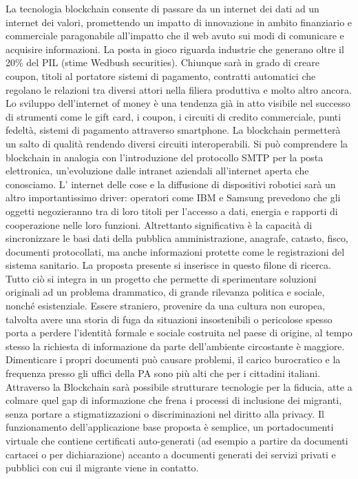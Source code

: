 La tecnologia blockchain consente di passare da un internet dei dati ad un internet dei valori, promettendo un impatto di innovazione in ambito finanziario e commerciale paragonabile all’impatto che il web avuto sui modi di comunicare e acquisire informazioni.
La posta in gioco riguarda industrie che generano oltre il 20\% del PIL (stime Wedbush securities). Chiunque sarà in grado di creare coupon, titoli al portatore sistemi di pagamento, contratti automatici che regolano le relazioni tra diversi attori nella filiera produttiva e molto altro ancora.
Lo sviluppo dell’internet of money è una tendenza già in atto visibile nel successo di strumenti come le gift card, i coupon, i circuiti di credito commerciale, punti fedeltà, sistemi di pagamento attraverso smartphone.
La blockchain permetterà un salto di qualità rendendo diversi circuiti interoperabili. Si può comprendere la blockchain in analogia con l’introduzione del protocollo SMTP per la posta elettronica, un’evoluzione dalle intranet aziendali all’internet aperta che conosciamo.
L’ internet delle cose e la diffusione di dispositivi robotici sarà un altro importantissimo driver: operatori come IBM e Samsung prevedono che gli oggetti negozieranno tra di loro titoli per l’accesso a dati, energia e rapporti di cooperazione nelle loro funzioni.
Altrettanto significativa è la capacità di sincronizzare le basi dati della pubblica amministrazione, anagrafe, catasto, fisco, documenti protocollati, ma anche informazioni protette come le registrazioni del sistema sanitario. La proposta presente si inserisce in questo filone di ricerca.
Tutto ciò si integra in un progetto che permette di sperimentare soluzioni originali ad un problema drammatico, di grande rilevanza politica e sociale, nonché esistenziale.
Essere straniero, provenire da una cultura non europea, talvolta avere una storia di fuga da situazioni insostenibili o pericolose spesso porta a perdere l’identità formale e sociale costruita nel paese di origine, al tempo stesso la richiesta di informazione da parte dell’ambiente circostante è maggiore. Dimenticare i propri documenti può causare problemi, il carico burocratico e la frequenza presso gli uffici della PA sono più alti che per i cittadini italiani.
Attraverso la Blockchain sarà possibile strutturare tecnologie per la fiducia, atte a colmare quel gap di informazione che frena i processi di inclusione dei migranti, senza portare a stigmatizzazioni o discriminazioni nel diritto alla privacy.
Il funzionamento dell’applicazione base proposta è semplice, un portadocumenti virtuale che contiene certificati auto-generati (ad esempio a partire da documenti cartacei o per dichiarazione) accanto a documenti generati dei servizi privati e pubblici con cui il migrante viene in contatto.
